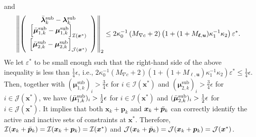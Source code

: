 \documentclass[aos]{imsart}
\numberwithin{equation}{section}
\theoremstyle{plain}
\begin{document}
\begin{appendix}
\begin{equation*}
   \end{equation*}
   and
   \begin{equation*}
       \left\| \left( \begin{array}{c}
        \Bar{\bm{\lambda}}_k^{\text{sub}}  -\bm{\lambda}_k^{\text{sub}}  \\
        \left[ \Bar{\bm{\mu}}_{1,k}^{\text{sub}} - \bm{\mu}_{1,k}^{\text{sub}} \right]_{\mathcal{I}(\bm{x}^{*})} \\
        \left[ \Bar{\bm{\mu}}_{2,k}^{\text{sub}} - \bm{\mu}_{2,k}^{\text{sub}} \right]_{\mathcal{J}(\bm{x}^{*})}
       \end{array} \right) \right\|_2 \leq 2 \kappa_0^{-1} \left( M_{\nabla c} +2 \right) \left( 1 + (1+M_{\bm{\ell},\bm{u}}) \kappa_1^{-1} \kappa_2 \right) \varepsilon^{*}.
   \end{equation*}
   We let $\varepsilon^{*}$ to be small enough such that the right-hand side of the above inequality is less than $\frac{1}{4} \epsilon$, i.e., $2 \kappa_0^{-1} \left( M_{\nabla c} +2 \right) \left( 1 + (1+M_{\bm{\ell},\bm{u}}) \kappa_1^{-1} \kappa_2 \right) \varepsilon^{*} \leq \frac{1}{4} \epsilon$. Then, together with $(\bm{\mu}_{1,k}^{\text{sub}})_{i} > \frac{3}{4} \epsilon$ for $i \in \mathcal{I}(\bm{x}^{*})$ and $(\bm{\mu}_{2,k}^{\text{sub}})_{i} > \frac{3}{4} \epsilon$ for $i \in \mathcal{J}(\bm{x}^{*})$, we have $(\Bar{\bm{\mu}}_{1,k}^{\text{sub}})_{i} > \frac{1}{2} \epsilon$ for $i \in \mathcal{I}(\bm{x}^{*})$ and $(\Bar{\bm{\mu}}_{2,k}^{\text{sub}})_{i} > \frac{1}{2} \epsilon$ for $i \in \mathcal{J}(\bm{x}^{*})$. It implies that both $\bm{x}_k + \bm{p}_k$ and $\bm{x}_k + \Bar{\bm{p}}_k$ can correctly identify the active and inactive sets of constraints at $\bm{x}^{*}$. Therefore, $\mathcal{I}(\bm{x}_k + \Bar{\bm{p}}_k) = \mathcal{I}(\bm{x}_k + \bm{p}_k) = \mathcal{I}(\bm{x}^{*})$ and $\mathcal{J}(\bm{x}_k + \Bar{\bm{p}}_k) = \mathcal{J}(\bm{x}_k + \bm{p}_k) = \mathcal{J}(\bm{x}^{*})$.



\end{appendix}
\end{document}
